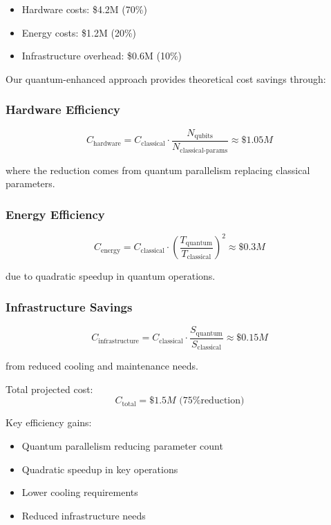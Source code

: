 \documentclass{article}
\begin{document}
\begin{itemize}
\item Hardware costs: \$4.2M (70\%)
\item Energy costs: \$1.2M (20\%)
\item Infrastructure overhead: \$0.6M (10\%)
\end{itemize}

Our quantum-enhanced approach provides theoretical cost savings through:

\subsubsection{Hardware Efficiency}
\begin{equation}
C_{\text{hardware}} = C_{\text{classical}} \cdot \frac{N_{\text{qubits}}}{N_{\text{classical-params}}} \approx \$1.05M
\end{equation}

where the reduction comes from quantum parallelism replacing classical parameters.

\subsubsection{Energy Efficiency}
\begin{equation}
C_{\text{energy}} = C_{\text{classical}} \cdot \left(\frac{T_{\text{quantum}}}{T_{\text{classical}}}\right)^2 \approx \$0.3M
\end{equation}

due to quadratic speedup in quantum operations.

\subsubsection{Infrastructure Savings}
\begin{equation}
C_{\text{infrastructure}} = C_{\text{classical}} \cdot \frac{S_{\text{quantum}}}{S_{\text{classical}}} \approx \$0.15M
\end{equation}

from reduced cooling and maintenance needs.

Total projected cost:
\begin{equation}
C_{\text{total}} = \$1.5M \text{ (75\% reduction)}
\end{equation}

Key efficiency gains:
\begin{itemize}
\item Quantum parallelism reducing parameter count
\item Quadratic speedup in key operations
\item Lower cooling requirements
\item Reduced infrastructure needs
\end{itemize}
\end{document}
